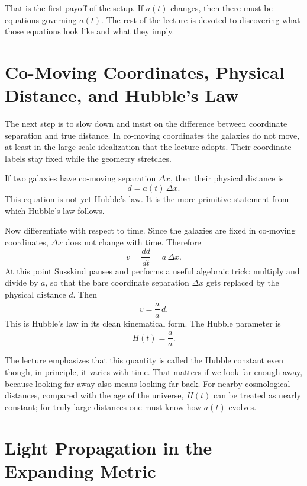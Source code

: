 That is the first payoff of the setup. If \(a(t)\) changes, then there must be equations governing \(a(t)\). The rest of the lecture is devoted to discovering what those equations look like and what they imply.

\section{Co-Moving Coordinates, Physical Distance, and Hubble's Law}

The next step is to slow down and insist on the difference between coordinate separation and true distance. In co-moving coordinates the galaxies do not move, at least in the large-scale idealization that the lecture adopts. Their coordinate labels stay fixed while the geometry stretches.

If two galaxies have co-moving separation \(\Delta x\), then their physical distance is
\begin{equation}
d = a(t)\,\Delta x.
\end{equation}
This equation is not yet Hubble's law. It is the more primitive statement from which Hubble's law follows.

Now differentiate with respect to time. Since the galaxies are fixed in co-moving coordinates, \(\Delta x\) does not change with time. Therefore
\begin{equation}
v = \frac{dd}{dt} = \dot a\,\Delta x.
\end{equation}
At this point Susskind pauses and performs a useful algebraic trick: multiply and divide by \(a\), so that the bare coordinate separation \(\Delta x\) gets replaced by the physical distance \(d\). Then
\begin{equation}
v = \frac{\dot a}{a}\,d.
\end{equation}
This is Hubble's law in its clean kinematical form. The Hubble parameter is
\begin{equation}
H(t)=\frac{\dot a}{a}.
\end{equation}

The lecture emphasizes that this quantity is called the Hubble constant even though, in principle, it varies with time. That matters if we look far enough away, because looking far away also means looking far back. For nearby cosmological distances, compared with the age of the universe, \(H(t)\) can be treated as nearly constant; for truly large distances one must know how \(a(t)\) evolves.

\section{Light Propagation in the Expanding Metric}

